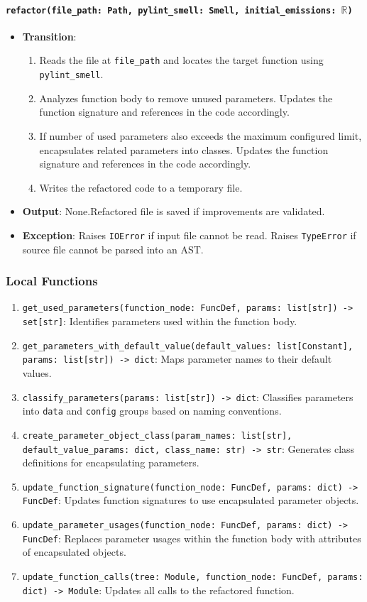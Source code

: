 \documentclass[12pt, titlepage]{article}
\begin{document}
\paragraph{\texttt{refactor(file\_path: Path, pylint\_smell: Smell, initial\_emissions: $\mathbb{R}$)}}
\begin{itemize}
\item \textbf{Transition}:
\begin{enumerate}
\item Reads the file at \texttt{file\_path} and locates the target function using \texttt{pylint\_smell}.
\item Analyzes function body to remove unused parameters. Updates the function signature and references in the code accordingly.
\item If number of used parameters also exceeds the maximum configured limit, encapsulates related parameters into classes. Updates the function signature and references in the code accordingly.
\item Writes the refactored code to a temporary file.
\end{enumerate}
\item \textbf{Output}: None.Refactored file is saved if improvements are validated. 
\item \textbf{Exception}: Raises \texttt{IOError} if input file cannot be read. Raises \texttt{TypeError} if source file cannot be parsed into an AST.
\end{itemize}

\subsubsection{Local Functions}

\begin{enumerate}
\item \texttt{get\_used\_parameters(function\_node: FuncDef, params: list[str]) -> set[str]}: Identifies parameters used within the function body.
\item \texttt{get\_parameters\_with\_default\_value(default\_values: list[Constant], params: list[str]) -> dict}: Maps parameter names to their default values.
\item \texttt{classify\_parameters(params: list[str]) -> dict}: Classifies parameters into \texttt{data} and \texttt{config} groups based on naming conventions.
\item \texttt{create\_parameter\_object\_class(param\_names: list[str], default\_value\_params: dict, class\_name: str) -> str}: Generates class definitions for encapsulating parameters.
\item \texttt{update\_function\_signature(function\_node: FuncDef, params: dict) -> FuncDef}: Updates function signatures to use encapsulated parameter objects.
\item \texttt{update\_parameter\_usages(function\_node: FuncDef, params: dict) -> FuncDef}: Replaces parameter usages within the function body with attributes of encapsulated objects.
\item \texttt{update\_function\_calls(tree: Module, function\_node: FuncDef, params: dict) -> Module}: Updates all calls to the refactored function.
\end{enumerate}
\end{document}
